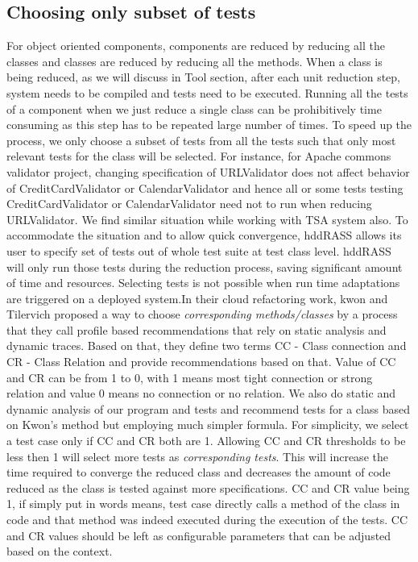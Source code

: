 \subsection{Choosing only subset of tests}
For object oriented components, components are reduced by reducing all the classes and classes are reduced by reducing all the methods. When a class is being reduced, as we will discuss in Tool section, after each unit reduction step, system needs to be compiled and tests need to be executed. Running all the tests of a component when we just reduce a single class can be prohibitively time consuming as this step has to be repeated large number of times. To speed up the process, we only choose a subset of tests from all the tests such that only most relevant tests for the class will be selected. For instance, for Apache commons validator project, changing specification of URLValidator does not affect behavior of CreditCardValidator or CalendarValidator and hence all or some tests testing CreditCardValidator or CalendarValidator need not to run when reducing URLValidator. We find similar situation while working with TSA system also. To accommodate the situation and to allow quick convergence, hddRASS allows its user to specify set of tests out of whole test suite at test class level. hddRASS will only run those tests during the reduction process, saving significant amount of time and resources. Selecting tests is not possible when run time adaptations are triggered on a deployed system.In their cloud refactoring work, kwon and Tilervich proposed a way to choose \emph{corresponding methods/classes}  by a process that they call profile based recommendations that rely on static analysis and dynamic traces. Based on that, they define two terms CC - Class connection and CR - Class Relation and provide recommendations based on that. Value of CC and CR can be from 1 to 0, with 1 means most tight connection or strong relation and value 0 means no connection or no relation. We also do static and dynamic analysis of our program and tests and recommend tests for a class based on Kwon's method but employing much simpler formula. For simplicity, we select a test case only if CC and CR both are 1. Allowing CC and CR thresholds to be less then 1 will select more tests as \emph{corresponding tests}. This will increase the time required to converge the reduced class and decreases the amount of code reduced as the class is tested against more specifications. CC and CR value being 1, if simply put in words means, test case directly calls a method of the class in code and that method was indeed executed during the execution of the tests. CC and CR values should be left as configurable parameters that can be adjusted based on the context.      
